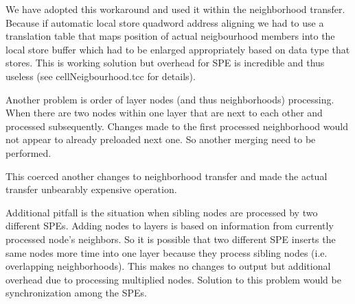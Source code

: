 We have adopted this workaround and used it within the neighborhood transfer.
Because if automatic local store quadword address aligning we had to use a translation table that maps position of actual neigbourhood members into the local store buffer which had to be enlarged appropriately based on data type that stores.
This is working solution but overhead for SPE is incredible and thus useless (see cellNeigbourhood.tcc for details).

\par
\label{neighbourhoodDependecy}
Another problem is order of layer nodes (and thus neighborhoods) processing.
When there are two nodes within one layer that are next to each other and processed subsequently.
Changes made to the first processed neighborhood would not appear to already preloaded next one.
So another merging need to be performed.

\par
This coerced another changes to neighborhood transfer and made the actual transfer unbearably expensive operation.

\par
\label{workDependecy}
Additional pitfall is the situation when sibling nodes are processed by two different SPEs.
Adding nodes to layers is based on information from currently processed node's neighbors.
So it is possible that two different SPE inserts the same nodes more time into one layer because they process sibling nodes (i.e. overlapping neighborhoods).
This makes no changes to output but additional overhead due to processing multiplied nodes.
Solution to this problem would be synchronization among the SPEs.

